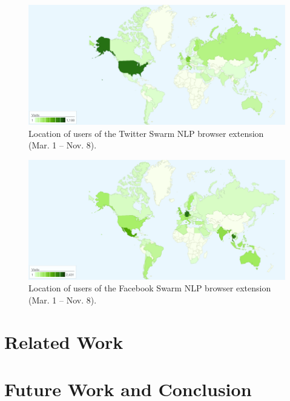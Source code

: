 \documentclass{iosart2c}
\begin{document}
\begin{figure}
\centering
\includegraphics[width=1.0\linewidth]{./resources/twitterlocation.png}
\caption{Location of users of the Twitter Swarm NLP browser extension (Mar. 1 -- Nov. 8).}
\label{fig:twitterlocation}
\end{figure}

\begin{figure}
\centering
\includegraphics[width=1.0\linewidth]{./resources/facebooklocation.png}
\caption{Location of users of the Facebook Swarm NLP browser extension (Mar. 1 -- Nov. 8).}
\label{fig:facebooklocation}
\end{figure}

\section{Related Work} \label{sec:relatedwork}

\section{Future Work and Conclusion} \label{sec:futureworkandconclusion}



\end{document}
